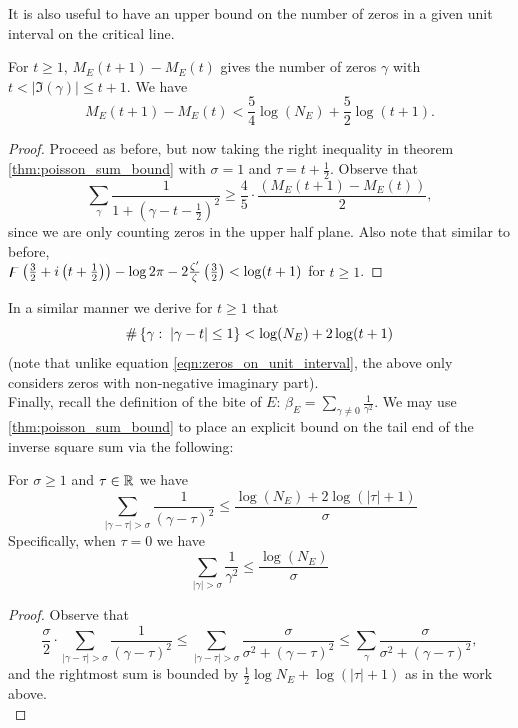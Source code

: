 It is also useful to have an upper bound on the number of zeros in a given unit interval on the critical line.
\begin{corollary}[GRH]\label{cor:zeros_on_unit_interval}
For $t\ge1$, $M_E(t+1)-M_E(t)$ gives the number of zeros $\gamma$ with $t < |\Im(\gamma)| \le t+1$. We have
\begin{equation}\label{eqn:zeros_on_unit_interval}
M_E(t+1)-M_E(t) < \frac{5}{4}\log(N_E) + \frac{5}{2}\log(t+1).
\end{equation}
\end{corollary}
\begin{proof}
Proceed as before, but now taking the right inequality in theorem \ref{thm:poisson_sum_bound} with $\sigma = 1$ and $\tau=t+\frac{1}{2}$. Observe that
\begin{equation*}
\sum_{\gamma}\frac{1}{1+\left(\gamma-t-\frac{1}{2}\right)^2} \ge \frac{4}{5}\cdot\frac{\left(M_E(t+1)-M_E(t)\right)}{2},
\end{equation*}
since we are only counting zeros in the upper half plane. Also note that similar to before,\\
$\digamma\left(\frac{3}{2}+i\left(t+\frac{1}{2}\right)\right) - \log 2\pi - 2\frac{\zeta^{\prime}}{\zeta}\left(\frac{3}{2}\right) < \log(t+1)$ for $t \ge 1$.
\end{proof}
In a similar manner we derive for $t \ge 1$ that
\begin{equation}\label{eqn:zeros_in_unit_ball}
\#\left\{\gamma:\;|\gamma-t|\le 1\right\} < \log(N_E) + 2\log(t+1)
\end{equation}
(note that unlike equation \ref{eqn:zeros_on_unit_interval}, the above only considers zeros with non-negative imaginary part). \\

Finally, recall the definition of the bite of $E$: $\beta_E = \sum_{\gamma \ne 0} \frac{1}{\gamma^2}$. We may use \ref{thm:poisson_sum_bound} to place an explicit bound on the tail end of the inverse square sum via the following:
\begin{corollary}[GRH]\label{cor:sum_tail_bound}
For $\sigma \ge 1$ and $\tau \in \mathbb{R}$ we have
\begin{equation}
\sum_{|\gamma-\tau|>\sigma} \frac{1}{(\gamma-\tau)^2} \le \frac{\log(N_E) + 2\log(|\tau|+1)}{\sigma}
\end{equation}
Specifically, when $\tau=0$ we have
\begin{equation}
\sum_{|\gamma|>\sigma} \frac{1}{\gamma^2} \le \frac{\log(N_E)}{\sigma}
\end{equation}
\end{corollary}
\begin{proof}
Observe that
\begin{equation*}
\frac{\sigma}{2}\cdot\sum_{|\gamma-\tau|>\sigma} \frac{1}{(\gamma-\tau)^2} \le \sum_{|\gamma-\tau|>\sigma} \frac{\sigma}{\sigma^2+(\gamma-\tau)^2} \le\sum_{\gamma} \frac{\sigma}{\sigma^2+(\gamma-\tau)^2},
\end{equation*}
and the rightmost sum is bounded by $\frac{1}{2}\log N_E + \log(|\tau|+1)$ as in the work above. \\
\end{proof}

